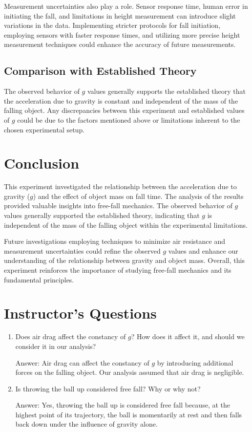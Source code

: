 \documentclass[journal]{IEEEtran}
\begin{document}
Measurement uncertainties also play a role. Sensor response time, human error in initiating the fall, and limitations in height measurement can introduce slight variations in the data. Implementing stricter protocols for fall initiation, employing sensors with faster response times, and utilizing more precise height measurement techniques could enhance the accuracy of future measurements.

\subsection*{Comparison with Established Theory}

The observed behavior of $g$ values generally supports the established theory that the acceleration due to gravity is constant and independent of the mass of the falling object. Any discrepancies between this experiment and established values of $g$ could be due to the factors mentioned above or limitations inherent to the chosen experimental setup.

\section{Conclusion}

This experiment investigated the relationship between the acceleration due to gravity ($g$) and the effect of object mass on fall time. The analysis of the results provided valuable insights into free-fall mechanics. The observed behavior of $g$ values generally supported the established theory, indicating that $g$ is independent of the mass of the falling object within the experimental limitations.

Future investigations employing techniques to minimize air resistance and measurement uncertainties could refine the observed $g$ values and enhance our understanding of the relationship between gravity and object mass. Overall, this experiment reinforces the importance of studying free-fall mechanics and its fundamental principles.

\section{Instructor's Questions}
\begin{enumerate}
    \item Does air drag affect the constancy of $g$? How does it affect it, and should we consider it in our analysis?
    
    Answer: Air drag can affect the constancy of $g$ by introducing additional forces on the falling object. Our analysis assumed that air drag is negligible.  
    
    \item Is throwing the ball up considered free fall? Why or why not?
    
    Answer: Yes, throwing the ball up is considered free fall because, at the highest point of its trajectory, the ball is momentarily at rest and then falls back down under the influence of gravity alone.
\end{enumerate}
\end{document}
